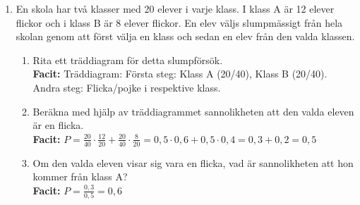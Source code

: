\documentclass[a4paper,11pt]{article}
\begin{document}
\begin{enumerate}[label=\textbf{\arabic*.}]
    \item En skola har två klasser med 20 elever i varje klass. I klass A är 12 elever flickor och i klass B är 8 elever flickor. En elev väljs slumpmässigt från hela skolan genom att först välja en klass och sedan en elev från den valda klassen.
    \begin{enumerate}[label=\alph*)]
        \item Rita ett träddiagram för detta slumpförsök.
        \\ \textbf{Facit:} Träddiagram: Första steg: Klass A (20/40), Klass B (20/40). Andra steg: Flicka/pojke i respektive klass.
        \item Beräkna med hjälp av träddiagrammet sannolikheten att den valda eleven är en flicka.
        \\ \textbf{Facit:} $P=\frac{20}{40}\cdot\frac{12}{20}+\frac{20}{40}\cdot\frac{8}{20}=0,5\cdot0,6+0,5\cdot0,4=0,3+0,2=0,5$
        \item Om den valda eleven visar sig vara en flicka, vad är sannolikheten att hon kommer från klass A?
        \\ \textbf{Facit:} $P=\frac{0,3}{0,5}=0,6$
    \end{enumerate}
\end{enumerate}
\end{document}

